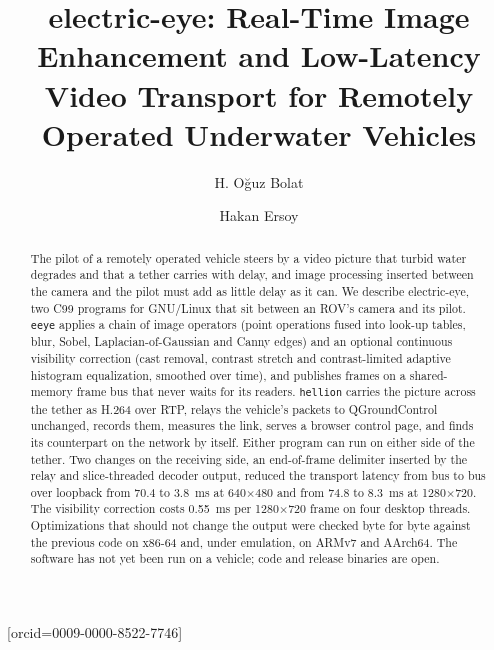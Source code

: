 \documentclass[a4paper,fleqn]{cas-sc}
\newcommand{\eeye}{\texttt{eeye}}
\newcommand{\hellion}{\texttt{hellion}}
\begin{document}
\let\WriteBookmarks\relax
\def\floatpagepagefraction{1}
\def\textpagefraction{.001}

\title [mode = title]{electric-eye: Real-Time Image Enhancement and Low-Latency Video
Transport for Remotely Operated Underwater Vehicles}

\author[1]{H. O\u{g}uz Bolat}[orcid=0009-0000-8522-7746]
\cormark[1]

\author[2]{Hakan Ersoy}

\address[1]{Department of Geomatics Engineering, Y\i{}ld\i{}z Technical University,
Davutpa\c{s}a Campus, 34220 Esenler, \.Istanbul, T\"urkiye}
\address[2]{Department of Electronics and Communication Engineering, Y\i{}ld\i{}z
Technical University, Davutpa\c{s}a Campus, 34220 Esenler, \.Istanbul, T\"urkiye}


\begin{abstract}
  The pilot of a remotely operated vehicle steers by a video picture that turbid water
  degrades and that a tether carries with delay, and image processing inserted between
  the camera and the pilot must add as little delay as it can. We describe
  electric-eye, two C99 programs for GNU/Linux that sit between an ROV's camera and its
  pilot. \eeye{} applies a chain of image operators (point operations fused into
  look-up tables, blur, Sobel, Laplacian-of-Gaussian and Canny edges) and an optional
  continuous visibility correction (cast removal, contrast stretch and contrast-limited
  adaptive histogram equalization, smoothed over time), and publishes frames on a
  shared-memory frame bus that never waits for its readers. \hellion{} carries the
  picture across the tether as H.264 over RTP, relays the vehicle's packets to
  QGroundControl unchanged, records them, measures the link, serves a browser control
  page, and finds its counterpart on the network by itself. Either program can run on
  either side of the tether. Two changes on the receiving side, an end-of-frame
  delimiter inserted by the relay and slice-threaded decoder output, reduced the
  transport latency from bus to bus over loopback from 70.4 to 3.8~ms at
  640$\times$480 and from 74.8 to 8.3~ms at 1280$\times$720. The visibility correction
  costs 0.55~ms per 1280$\times$720 frame on four desktop threads. Optimizations that
  should not change the output were checked byte for byte against the previous code on
  x86-64 and, under emulation, on ARMv7 and AArch64. The software has not yet been run
  on a vehicle; code and release binaries are open.
\end{abstract}
\end{document}
